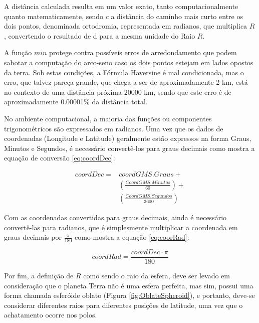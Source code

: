 A distância calculada resulta em um valor exato, tanto computacionalmente quanto matematicamente, sendo \(c\) a distância do caminho mais curto entre os dois pontos, denominada ortodromia, representada em radianos, que multiplica \(R\), convertendo o resultado de d para a mesma unidade do Raio \(R\). 

A função \(min\) protege contra possíveis erros de arredondamento que podem sabotar a computação do arco-seno caso os dois pontos estejam em lados opostos da terra. Sob estas condições, a Fórmula Haversine é mal condicionada, mas o erro, que talvez pareça grande, que chega a ser de aproximadamente 2 km, está no contexto de uma distância próxima 20000 km, sendo que este erro é de aproximadamente 0.00001\% da distância total.

No ambiente computacional, a maioria das funções ou componentes trigonométricos são expressados em radianos. Uma vez que os dados de coordenadas (Longitude e Latitude) geralmente estão expressos na forma Graus, Minutos e Segundos, é necessário convertê-los para graus decimais como mostra a equação de conversão \ref{eq:coordDec}:

\begin{equation}
\label{eq:coordDec}
\begin{matrix}
coordDec = 
& coordGMS.Graus +\\ 
& \left(\frac{CoordGMS.Minutos}{60}\right) +\\ 
& \left(\frac{CoordGMS.Segundos}{3600}\right)
\end{matrix}
\end{equation}

Com as coordenadas convertidas para graus decimais, ainda é necessário convertê-las para radianos, que é simplesmente multiplicar a coordenada em graus decimais por \(\frac{\pi}{180}\) como mostra a equação \ref{eq:coorRad}:

\begin{equation}
\label{eq:coorRad}
coordRad = \frac{coordDec \cdot \pi}{180}
\end{equation}

Por fim, a definição de \(R\) como sendo o raio da esfera, deve ser levado em consideração que o planeta Terra não é uma esfera perfeita, mas sim, possui uma forma chamada esferóide oblato (Figura \ref{fig:OblateSpheroid}), e portanto, deve-se considerar diferentes raios para diferentes posições de latitude, uma vez que o achatamento ocorre nos polos.  

